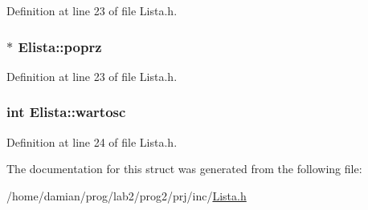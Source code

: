 Definition at line 23 of file Lista.\-h.

\hypertarget{struct_elista_aa4bfee465e1ea4484c9aeddc2437e532}{
\subsubsection[{poprz}]{ $\ast$ Elista\-::poprz}}\label{struct_elista_aa4bfee465e1ea4484c9aeddc2437e532}


Definition at line 23 of file Lista.\-h.

\hypertarget{struct_elista_a8de211523404f6484098bc85dd1ce52b}{
\subsubsection[{wartosc}]{\setlength{\rightskip}{0pt plus 5cm}int Elista\-::wartosc}}\label{struct_elista_a8de211523404f6484098bc85dd1ce52b}


Definition at line 24 of file Lista.\-h.



The documentation for this struct was generated from the following file\-:\begin{DoxyCompactItemize}
\item 
/home/damian/prog/lab2/prog2/prj/inc/\hyperlink{_lista_8h}{Lista.\-h}\end{DoxyCompactItemize}
